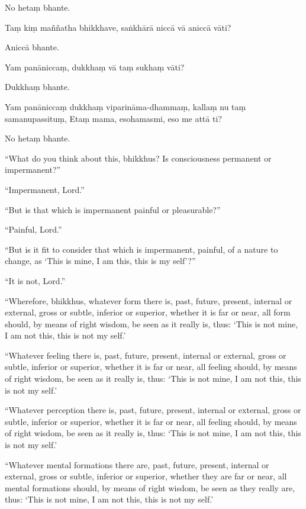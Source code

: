 No hetaṃ bhante.

Taṃ kiṃ maññatha bhikkhave, saṅkhārā niccā vā aniccā vāti?

Aniccā bhante.

Yam panāniccaṃ, dukkhaṃ vā taṃ sukhaṃ vāti?

Dukkhaṃ bhante.

Yam panāniccaṃ dukkhaṃ viparināma-dhammaṃ, kallaṃ nu taṃ samanupassituṃ,
Etaṃ mama, esohamasmi, eso me attā ti?

No hetaṃ bhante.

\clearpage

\englishText

``What do you think about this, bhikkhus? Is consciousness permanent or
impermanent?''

``Impermanent, Lord.''

``But is that which is impermanent painful or pleasurable?''

``Painful, Lord.''

``But is it fit to consider that which is impermanent, painful, of a
nature to change, as `This is mine, I am this, this is my self'?''

``It is not, Lord.''

``Wherefore, bhikkhus, whatever form there is, past, future, present,
internal or external, gross or subtle, inferior or superior, whether it
is far or near, all form should, by means of right wisdom, be seen as it
really is, thus: `This is not mine, I am not this, this is not my self.'

``Whatever feeling there is, past, future, present, internal or
external, gross or subtle, inferior or superior, whether it is far or
near, all feeling should, by means of right wisdom, be seen as it really
is, thus: `This is not mine, I am not this, this is not my self.'

``Whatever perception there is, past, future, present, internal or
external, gross or subtle, inferior or superior, whether it is far or
near, all feeling should, by means of right wisdom, be seen as it really
is, thus: `This is not mine, I am not this, this is not my self.'

``Whatever mental formations there are, past, future, present, internal
or external, gross or subtle, inferior or superior, whether they are far
or near, all mental formations should, by means of right wisdom, be seen
as they really are, thus: `This is not mine, I am not this, this is not
my self.'

\clearpage

